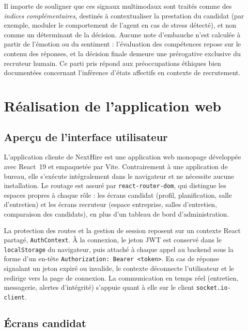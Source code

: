 Il importe de souligner que ces signaux multimodaux sont traités comme des \textit{indices complémentaires}, destinés à contextualiser la prestation du candidat (par exemple, moduler le comportement de l'agent en cas de stress détecté), et non comme un déterminant de la décision. Aucune note d'embauche n'est calculée à partir de l'émotion ou du sentiment : l'évaluation des compétences repose sur le contenu des réponses, et la décision finale demeure une prérogative exclusive du recruteur humain. Ce parti pris répond aux préoccupations éthiques bien documentées concernant l'inférence d'états affectifs en contexte de recrutement.

\section{Réalisation de l'application web}

\subsection{Aperçu de l'interface utilisateur}

L'application cliente de NextHire est une application web monopage développée avec React~19
et empaquetée par Vite. Contrairement à une application de bureau, elle s'exécute
intégralement dans le navigateur et ne nécessite aucune installation. Le routage est assuré
par \texttt{react-router-dom}, qui distingue les espaces propres à chaque rôle : les écrans
candidat (profil, planification, salle d'entretien) et les écrans recruteur (espace
entreprise, salles d'entretien, comparaison des candidats), en plus d'un tableau de bord
d'administration.

La protection des routes et la gestion de session reposent sur un contexte React partagé,
\texttt{AuthContext}. À la connexion, le jeton JWT est conservé dans le \texttt{localStorage}
du navigateur, puis attaché à chaque appel au backend sous la forme d'un en-tête
\texttt{Authorization: Bearer <token>}. En cas de réponse signalant un jeton expiré ou
invalide, le contexte déconnecte l'utilisateur et le redirige vers la page de connexion. La
communication en temps réel (entretien, messagerie, alertes d'intégrité) s'appuie quant à
elle sur le client \texttt{socket.io-client}.

\subsection{Écrans candidat}

